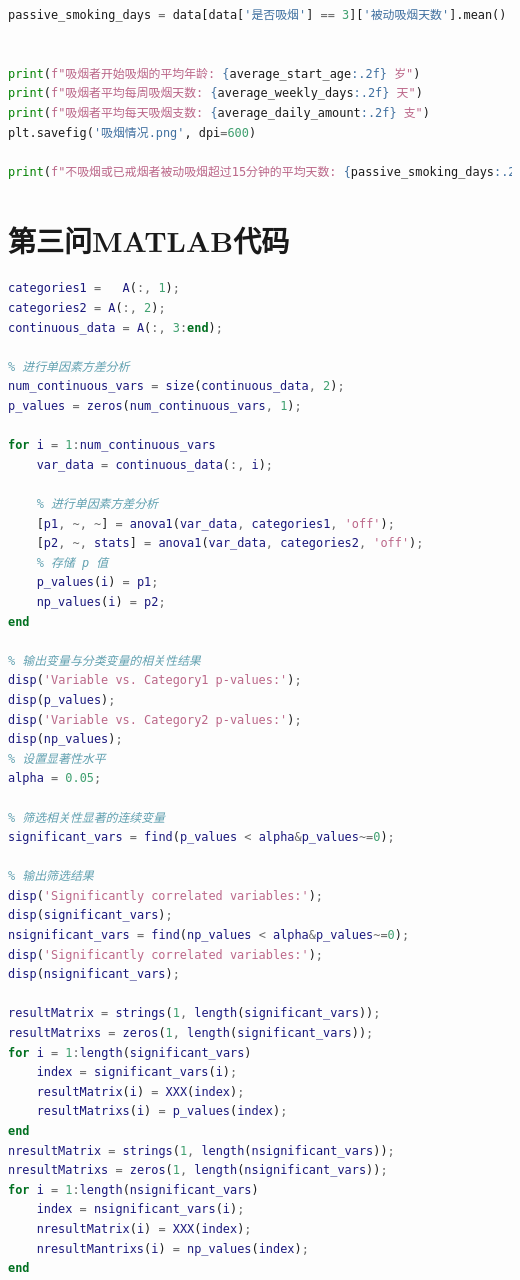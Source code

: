 \documentclass[withoutpreface,bwprint]{cumcmthesis} %
\begin{document}
\begin{appendices}
\begin{lstlisting}[language=python]
passive_smoking_days = data[data['是否吸烟'] == 3]['被动吸烟天数'].mean()


print(f"吸烟者开始吸烟的平均年龄: {average_start_age:.2f} 岁")
print(f"吸烟者平均每周吸烟天数: {average_weekly_days:.2f} 天")
print(f"吸烟者平均每天吸烟支数: {average_daily_amount:.2f} 支")
plt.savefig('吸烟情况.png', dpi=600)

print(f"不吸烟或已戒烟者被动吸烟超过15分钟的平均天数: {passive_smoking_days:.2f} 天")


\end{lstlisting}
\section{第三问MATLAB代码}
\begin{lstlisting}[language=matlab]
% 提取分类变量和其他连续变量
categories1 =   A(:, 1); 
categories2 = A(:, 2);   
continuous_data = A(:, 3:end); 

% 进行单因素方差分析
num_continuous_vars = size(continuous_data, 2);
p_values = zeros(num_continuous_vars, 1);

for i = 1:num_continuous_vars
    var_data = continuous_data(:, i);
    
    % 进行单因素方差分析
    [p1, ~, ~] = anova1(var_data, categories1, 'off');
    [p2, ~, stats] = anova1(var_data, categories2, 'off');
    % 存储 p 值
    p_values(i) = p1;
    np_values(i) = p2;
end

% 输出变量与分类变量的相关性结果
disp('Variable vs. Category1 p-values:');
disp(p_values);
disp('Variable vs. Category2 p-values:');
disp(np_values);
% 设置显著性水平
alpha = 0.05;

% 筛选相关性显著的连续变量
significant_vars = find(p_values < alpha&p_values~=0);

% 输出筛选结果
disp('Significantly correlated variables:');
disp(significant_vars);
nsignificant_vars = find(np_values < alpha&p_values~=0);
disp('Significantly correlated variables:');
disp(nsignificant_vars);

resultMatrix = strings(1, length(significant_vars));
resultMatrixs = zeros(1, length(significant_vars));
for i = 1:length(significant_vars)
    index = significant_vars(i);
    resultMatrix(i) = XXX(index);
    resultMatrixs(i) = p_values(index);
end
nresultMatrix = strings(1, length(nsignificant_vars));
nresultMatrixs = zeros(1, length(nsignificant_vars));
for i = 1:length(nsignificant_vars)
    index = nsignificant_vars(i);
    nresultMatrix(i) = XXX(index);
    nresultMantrixs(i) = np_values(index);
end


\end{lstlisting}
\end{appendices}
\end{document}
